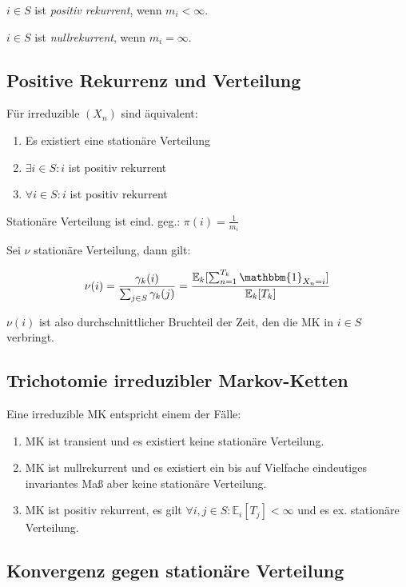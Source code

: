 $i \in S$ ist \emph{positiv rekurrent}, wenn $m_i < \infty$.

$i \in S$ ist \emph{nullrekurrent}, wenn $m_i = \infty$.

\subsection*{Positive Rekurrenz und Verteilung}

Für irreduzible $(X_n)$ sind äquivalent:

\begin{enumerate}[label=(\alph*)]
	\item Es existiert eine stationäre Verteilung
	\item $\exists i \in S : i$ ist positiv rekurrent
	\item $\forall i \in S : i$ ist positiv rekurrent
\end{enumerate}

Stationäre Verteilung ist eind. geg.: $\pi(i) = \frac{1}{m_i}$

Sei $\nu$ stationäre Verteilung, dann gilt:

$$\nu(i) = \frac{\gamma_k(i)}{\sum_{j \in S} \gamma_k(j)} = \frac{\mathbb{E}_k[\sum_{n=1}^{T_k} \mathbbm{1}_{X_n = i}]}{\mathbb{E}_k[T_k]}$$

$\nu(i)$ ist also durchschnittlicher Bruchteil der Zeit, den die MK in $i \in S$ verbringt.

\subsection*{Trichotomie irreduzibler Markov-Ketten}

Eine irreduzible MK entspricht einem der Fälle:

\begin{enumerate}[label=(\alph*)]
	\item MK ist transient und es existiert keine stationäre Verteilung.
	\item MK ist nullrekurrent und es existiert ein bis auf Vielfache eindeutiges invariantes Maß aber keine stationäre Verteilung.
	\item MK ist positiv rekurrent, es gilt $\forall i, j \in S : \mathbb{E}_i[T_j] < \infty$ und es ex. stationäre Verteilung.
\end{enumerate}

\subsection*{Konvergenz gegen stationäre Verteilung}

